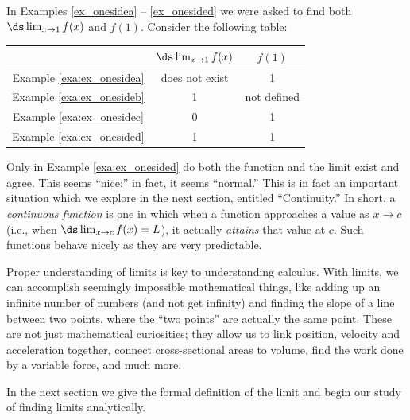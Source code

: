 In Examples \ref{ex_onesidea} -- \ref{ex_onesided} we were asked to find both $\ds \lim_{x\to 1}f(x)$ and $f(1)$. Consider the following table:
\begin{center}
\begin{tabular}{ccc} & $\ds \lim_{x\to 1}f(x)$ & $f(1)$ \vspace{2pt}\\ \hline
Example \ref{exa:ex_onesidea} & does not exist & 1 \\
Example \ref{exa:ex_onesideb} & 1 & not defined \\
Example \ref{exa:ex_onesidec} & 0 & 1 \\
Example \ref{exa:ex_onesided} & 1 & 1 \\
\end{tabular}
\end{center}

Only in Example \ref{exa:ex_onesided} do both the function and the limit exist and agree. This seems ``nice;'' in fact, it seems ``normal.'' This is in fact an important situation which we explore in the next section, entitled ``Continuity.'' In short, a \textit{continuous function} is one in which when a function approaches a value as $x\rightarrow c$ (i.e., when $\ds \lim_{x\to c} f(x) = L$), it actually \textit{attains} that value at $c$. Such functions behave nicely as they are very predictable.



Proper understanding of limits is key to understanding calculus. With limits, we can accomplish seemingly impossible mathematical things, like adding up an infinite number of numbers (and not get infinity) and finding the slope of a line between two points, where the ``two points'' are actually the same point. These are not just mathematical curiosities; they allow us to link position, velocity and acceleration together, connect cross-sectional areas to volume, find the work done by a variable force, and much more.


In the next section we give the formal definition of the limit and begin our study of finding limits analytically. 









%


%


